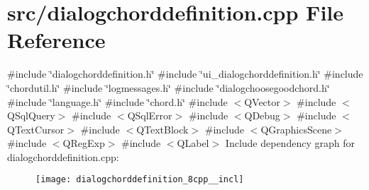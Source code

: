 \section{src/dialogchorddefinition.cpp File Reference}
\label{dialogchorddefinition_8cpp}
{\ttfamily \#include \char`\"{}dialogchorddefinition.\+h\char`\"{}}\newline
{\ttfamily \#include \char`\"{}ui\+\_\+dialogchorddefinition.\+h\char`\"{}}\newline
{\ttfamily \#include \char`\"{}chordutil.\+h\char`\"{}}\newline
{\ttfamily \#include \char`\"{}logmessages.\+h\char`\"{}}\newline
{\ttfamily \#include \char`\"{}dialogchoosegoodchord.\+h\char`\"{}}\newline
{\ttfamily \#include \char`\"{}language.\+h\char`\"{}}\newline
{\ttfamily \#include \char`\"{}chord.\+h\char`\"{}}\newline
{\ttfamily \#include $<$Q\+Vector$>$}\newline
{\ttfamily \#include $<$Q\+Sql\+Query$>$}\newline
{\ttfamily \#include $<$Q\+Sql\+Error$>$}\newline
{\ttfamily \#include $<$Q\+Debug$>$}\newline
{\ttfamily \#include $<$Q\+Text\+Cursor$>$}\newline
{\ttfamily \#include $<$Q\+Text\+Block$>$}\newline
{\ttfamily \#include $<$Q\+Graphics\+Scene$>$}\newline
{\ttfamily \#include $<$Q\+Reg\+Exp$>$}\newline
{\ttfamily \#include $<$Q\+Label$>$}\newline
Include dependency graph for dialogchorddefinition.\+cpp\+:\nopagebreak
\begin{figure}[H]
\begin{center}
\leavevmode
\texttt{[image: dialogchorddefinition\_8cpp\_\_incl]}
\end{center}
\end{figure}

